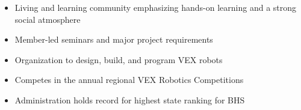 \documentclass[10pt,a4paper,ragged2e,withhyper]{altacv}
\begin{document}
\begin{paracol}{2}
\divider\medskip

\par\smallskip
{}
\par\smallskip
{}
\par\smallskip
{}
\par

\medskip 


\begin{itemize}
    \item Living and learning community emphasizing hands-on learning and a strong social atmosphere
    \item Member-led seminars and major project requirements
\end{itemize}

\divider

\begin{itemize}
    \item Organization to design, build, and program VEX robots
    \item Competes in the annual regional VEX Robotics Competitions
    \item Administration holds record for highest state ranking for BHS
\end{itemize}

\medskip

\end{paracol}
\end{document}
